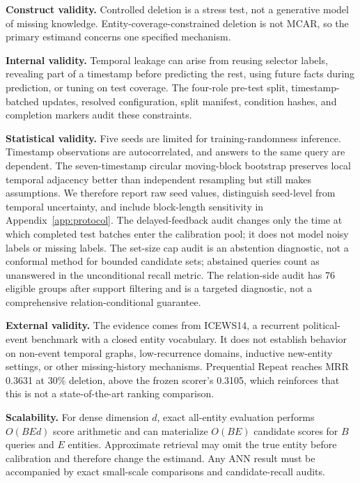 \documentclass[information,article,submit,oneauthor,pdftex]{Definitions/mdpi}
\begin{document}
\textbf{Construct validity.}
Controlled deletion is a stress test, not a generative model of missing
knowledge. Entity-coverage-constrained deletion is not MCAR, so the primary
estimand concerns one specified mechanism.

\textbf{Internal validity.}
Temporal leakage can arise from reusing selector labels, revealing part of a
timestamp before predicting the rest, using future facts during prediction, or
tuning on test coverage. The four-role pre-test split, timestamp-batched
updates, resolved configuration, split manifest, condition hashes, and
completion markers audit these constraints.

\textbf{Statistical validity.}
Five seeds are limited for training-randomness inference. Timestamp
observations are autocorrelated, and answers to the same query are dependent.
The seven-timestamp circular moving-block bootstrap preserves local temporal
adjacency better than independent resampling but still makes assumptions. We
therefore report raw seed values, distinguish seed-level from temporal
uncertainty, and include block-length sensitivity in Appendix~\ref{app:protocol}.
The delayed-feedback audit changes only the time at which completed test
batches enter the calibration pool; it does not model noisy labels or missing
labels. The set-size cap audit is an abstention diagnostic, not a conformal
method for bounded candidate sets; abstained queries count as unanswered in the
unconditional recall metric. The relation-side audit has 76 eligible groups
after support filtering and is a targeted diagnostic, not a comprehensive
relation-conditional guarantee.

\textbf{External validity.}
The evidence comes from ICEWS14, a recurrent political-event benchmark with a
closed entity vocabulary. It does not establish behavior on non-event temporal
graphs, low-recurrence domains, inductive new-entity settings, or other
missing-history mechanisms. Prequential Repeat reaches MRR 0.3631 at 30\%
deletion, above the frozen scorer's 0.3105, which reinforces that this is not a
state-of-the-art ranking comparison.

\textbf{Scalability.}
For dense dimension \(d\), exact all-entity evaluation performs \(O(BEd)\)
score arithmetic and can materialize \(O(BE)\) candidate scores for \(B\)
queries and \(E\) entities. Approximate retrieval may omit the true entity
before calibration and therefore change the estimand. Any ANN result must be
accompanied by exact small-scale comparisons and candidate-recall audits.
\end{document}
